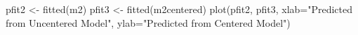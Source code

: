 \begin{Schunk}
\begin{Sinput}
 pfit2 <- fitted(m2)
 pfit3 <- fitted(m2centered)
 plot(pfit2, pfit3, xlab="Predicted from Uncentered Model", ylab="Predicted from Centered Model")
\end{Sinput}
\end{Schunk}
